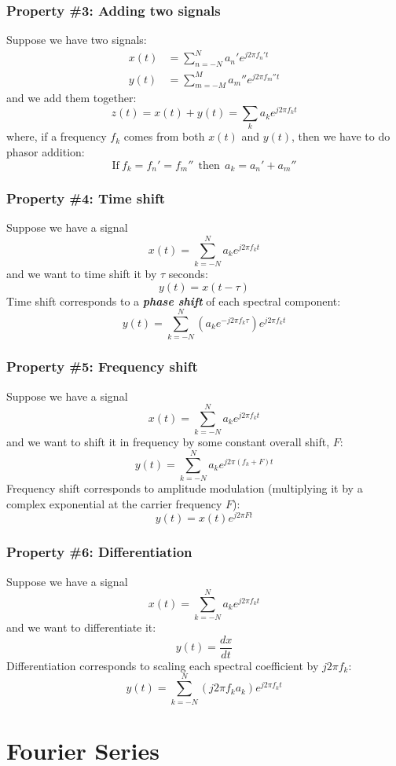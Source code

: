 \documentclass{beamer}
\begin{document}
\begin{frame}
  \frametitle{Property \#3: Adding two signals}

  Suppose we have two signals:
  \begin{align*}
    x(t) &= \sum_{n=-N}^N a_n'e^{j2\pi f_n't}\\
    y(t) &= \sum_{m=-M}^M a_m''e^{j2\pi f_m''t}
  \end{align*}
  and we add them together:
  \[
  z(t) = x(t) + y(t) = \sum_k a_ke^{j2\pi f_kt}
  \]
  where, if a frequency $f_k$ comes from both $x(t)$ and $y(t)$, then
  we have to do phasor addition:
  \[
  \mbox{If}~f_k=f_n'=f_m''~~\mbox{then}~~a_k=a_n'+a_m''
  \]
\end{frame}

\begin{frame}
  \frametitle{Property \#4: Time shift}

  Suppose we have a signal
  \[
  x(t) = \sum_{k=-N}^N a_ke^{j2\pi f_kt}
  \]
  and we want to time shift it by $\tau$ seconds:
  \[
  y(t) = x(t-\tau)
  \]
  Time shift corresponds to a {\em\bf phase shift} of each spectral component:
  \[
  y(t) = \sum_{k=-N}^N \left(a_ke^{-j2\pi f_k\tau}\right)e^{j2\pi f_kt}
  \]
\end{frame}

\begin{frame}
  \frametitle{Property \#5: Frequency shift}

  Suppose we have a signal
  \[
  x(t) = \sum_{k=-N}^N a_ke^{j2\pi f_kt}
  \]
  and we want to shift it in frequency by some constant overall shift, $F$:
  \[
  y(t) = \sum_{k=-N}^N a_ke^{j2\pi \left(f_k+F\right)t}
  \]
  Frequency shift corresponds to amplitude modulation (multiplying it by a
  complex exponential at the carrier frequency $F$):
  \[
  y(t) = x(t) e^{j2\pi Ft}
  \]
\end{frame}

\begin{frame}
  \frametitle{Property \#6: Differentiation}

  Suppose we have a signal
  \[
  x(t) = \sum_{k=-N}^N a_ke^{j2\pi f_kt}
  \]
  and we want to differentiate it:
  \[
  y(t) = \frac{dx}{dt}
  \]
  Differentiation corresponds to scaling each spectral coefficient by
  $j2\pi f_k$:
  \[
  y(t) = \sum_{k=-N}^N \left(j2\pi f_k a_k\right)e^{j2\pi f_kt}
  \]
\end{frame}

\section[Fourier]{Fourier Series}
\setcounter{subsection}{1}
\end{document}
